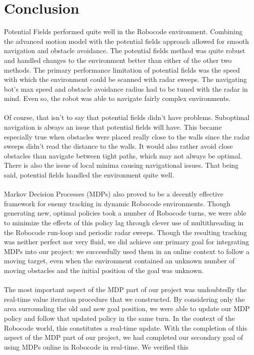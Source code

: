 \documentclass{aiaa-tc}%
\begin{document}
\section{Conclusion}
\label{Conclusion}
\noindent
Potential Fields performed quite well in the Robocode environment. Combining the advanced motion model with the potential fields approach allowed for smooth navigation and obstacle avoidance. The potential fields method was quite robust and handled changes to the environment better than either of the other two methods. The primary performance limitation of potential fields was the speed with which the environment could be scanned with radar sweeps. The navigating bot's max speed and obstacle avoidance radius had to be tuned with the radar in mind. Even so, the robot was able to navigate fairly complex environments. \\ \\
Of course, that isn't to say that potential fields didn't have problems. Suboptimal navigation is always an issue that potential fields will have. This became especially true when obstacles were placed really close to the walls since the radar sweeps didn't read the distance to the walls. It would also rather avoid close obstacles than navigate between tight paths, which may not always be optimal. There is also the issue of local minima causing navigational issues. That being said, potential fields handled the environment quite well. \\ \\
Markov Decision Processes (MDPs) also proved to be a decently effective framework for enemy tracking in dynamic Robocode environments. Though generating new, optimal policies took a number of Robocode
turns, we were able to minimize the effects of this policy lag through clever use of multithreading in the Robocode run-loop and periodic radar sweeps. Though the resulting tracking was neither perfect nor very fluid,
we did achieve our primary goal for integrating MDPs into our project: we successfully used them in an online context to follow a moving target, even when the environment contained an unknown number of moving obstacles and the initial position
of the goal was unknown. \\ \\
The most important aspect of the MDP part of our project was undoubtedly the real-time value iteration procedure that we constructed. By considering only the area surrounding the old and new goal position, we were able to update our MDP policy and follow
that updated policy in the same turn. In the context of the Robocode world, this constitutes a real-time update. With the completion of this aspect of the MDP part of our project, we had completed our secondary goal of using MDPs online in Robocode in real-time. We verified this
\end{document}
